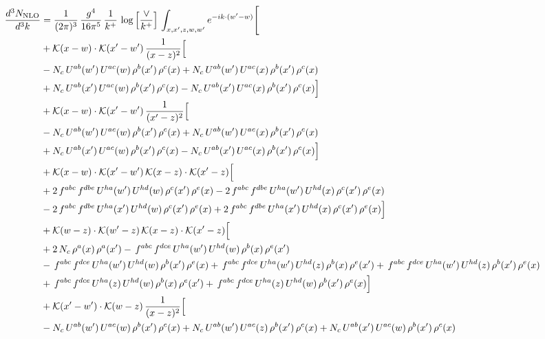 \documentclass[9pt]{article}
\numberwithin{equation}{section}
\begin{document}
\begin{align}
\frac{d^{3}N_{\mathrm{NLO}}}{d^{3}k} & = \frac{1}{(2\pi)^{3}}\,\frac{g^{4}}{16\pi^{5}}\,\frac{1}{k^{+}}\,\log\Big[\frac{\vee}{k^{+}}\Big]\,\int_{x,x',z,w,w'}e^{-ik\cdot(w'-w)}\Bigg[ \notag\\
& +\mathcal{K}(x-w)\cdot\mathcal{K}(x'-w')\,\frac{1}{(x-z)^{2}}\Big[\notag\\
& -N_{c}\,U^{ab}(w')\,U^{ac}(w)\,\rho^{b}(x')\,\rho^{c}(x) +N_{c}\,U^{ab}(w')\,U^{ac}(x)\,\rho^{b}(x')\,\rho^{c}(x)\notag\\
& +N_{c}\,U^{ab}(x')\,U^{ac}(w)\,\rho^{b}(x')\,\rho^{c}(x) -N_{c}\,U^{ab}(x')\,U^{ac}(x)\,\rho^{b}(x')\,\rho^{c}(x)\Big]\notag\\
& +\mathcal{K}(x-w)\cdot\mathcal{K}(x'-w')\,\frac{1}{(x'-z)^{2}}\Big[\notag\\
& -N_{c}\,U^{ab}(w')\,U^{ac}(w)\,\rho^{b}(x')\,\rho^{c}(x) +N_{c}\,U^{ab}(w')\,U^{ac}(x)\,\rho^{b}(x')\,\rho^{c}(x)\notag\\
& +N_{c}\,U^{ab}(x')\,U^{ac}(w)\,\rho^{b}(x')\,\rho^{c}(x) -N_{c}\,U^{ab}(x')\,U^{ac}(x)\,\rho^{b}(x')\,\rho^{c}(x)\Big]\notag\\
& +\mathcal{K}(x-w)\cdot\mathcal{K}(x'-w')\,\mathcal{K}(x-z)\cdot\mathcal{K}(x'-z)\Big[\notag\\
& +2\,f^{abc}\,f^{dbe}\,U^{ha}(w')\,U^{hd}(w)\,\rho^{c}(x')\,\rho^{e}(x) -2\,f^{abc}\,f^{dbe}\,U^{ha}(w')\,U^{hd}(x)\,\rho^{c}(x')\,\rho^{e}(x)\notag\\
& -2\,f^{abc}\,f^{dbe}\,U^{ha}(x')\,U^{hd}(w)\,\rho^{c}(x')\,\rho^{e}(x) +2\,f^{abc}\,f^{dbe}\,U^{ha}(x')\,U^{hd}(x)\,\rho^{c}(x')\,\rho^{e}(x)\Big]\notag\\
& +\mathcal{K}(w-z)\cdot\mathcal{K}(w'-z)\,\mathcal{K}(x-z)\cdot\mathcal{K}(x'-z)\Big[\notag\\
& +2\,N_{c}\,\rho^{a}(x)\,\rho^{a}(x') -\,f^{abc}\,f^{dce}\,U^{ha}(w')\,U^{hd}(w)\,\rho^{b}(x)\,\rho^{e}(x')\notag\\
& -\,f^{abc}\,f^{dce}\,U^{ha}(w')\,U^{hd}(w)\,\rho^{b}(x')\,\rho^{e}(x) +\,f^{abc}\,f^{dce}\,U^{ha}(w')\,U^{hd}(z)\,\rho^{b}(x)\,\rho^{e}(x') +\,f^{abc}\,f^{dce}\,U^{ha}(w')\,U^{hd}(z)\,\rho^{b}(x')\,\rho^{e}(x)\notag\\
& +\,f^{abc}\,f^{dce}\,U^{ha}(z)\,U^{hd}(w)\,\rho^{b}(x)\,\rho^{e}(x') +\,f^{abc}\,f^{dce}\,U^{ha}(z)\,U^{hd}(w)\,\rho^{b}(x')\,\rho^{e}(x)\Big]\notag\\
& +\mathcal{K}(x'-w')\cdot\mathcal{K}(w-z)\,\frac{1}{(x-z)^{2}}\Big[\notag\\
& -N_{c}\,U^{ab}(w')\,U^{ac}(w)\,\rho^{b}(x')\,\rho^{c}(x) +N_{c}\,U^{ab}(w')\,U^{ac}(z)\,\rho^{b}(x')\,\rho^{c}(x) +N_{c}\,U^{ab}(x')\,U^{ac}(w)\,\rho^{b}(x')\,\rho^{c}(x)\notag\\

\end{align}
\end{document}
